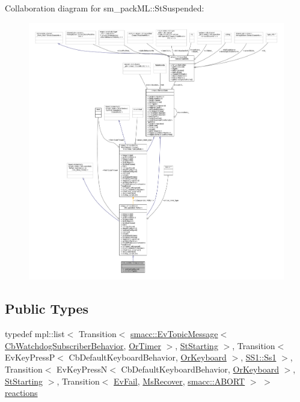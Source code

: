 Collaboration diagram for sm\+\_\+pack\+ML\+:\+:St\+Suspended\+:
\nopagebreak
\begin{figure}[H]
\begin{center}
\leavevmode
\includegraphics[width=350pt]{structsm__packML_1_1StSuspended__coll__graph}
\end{center}
\end{figure}
\subsection*{Public Types}
\begin{DoxyCompactItemize}
\item 
typedef mpl\+::list$<$ Transition$<$ \hyperlink{structsmacc_1_1default__events_1_1EvTopicMessage}{smacc\+::\+Ev\+Topic\+Message}$<$ \hyperlink{classsm__packML_1_1cl__subscriber_1_1CbWatchdogSubscriberBehavior}{Cb\+Watchdog\+Subscriber\+Behavior}, \hyperlink{classsm__packML_1_1OrTimer}{Or\+Timer} $>$, \hyperlink{structsm__packML_1_1StStarting}{St\+Starting} $>$, Transition$<$ Ev\+Key\+PressP$<$ Cb\+Default\+Keyboard\+Behavior, \hyperlink{classsm__packML_1_1OrKeyboard}{Or\+Keyboard} $>$, \hyperlink{structsm__packML_1_1SS1_1_1Ss1}{S\+S1\+::\+Ss1} $>$, Transition$<$ Ev\+Key\+PressN$<$ Cb\+Default\+Keyboard\+Behavior, \hyperlink{classsm__packML_1_1OrKeyboard}{Or\+Keyboard} $>$, \hyperlink{structsm__packML_1_1StStarting}{St\+Starting} $>$, Transition$<$ \hyperlink{structsm__packML_1_1EvFail}{Ev\+Fail}, \hyperlink{classsm__packML_1_1MsRecover}{Ms\+Recover}, \hyperlink{structsmacc_1_1default__transition__tags_1_1ABORT}{smacc\+::\+A\+B\+O\+RT} $>$ $>$ \hyperlink{structsm__packML_1_1StSuspended_a0d2af02072d0e0e19e54e5cc944153dc}{reactions}
\end{DoxyCompactItemize}
